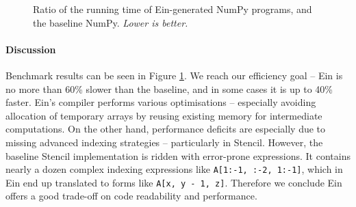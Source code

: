 \begin{figure}[b]
    \centering


    \caption{Ratio of the running time of Ein-generated NumPy programs, and the baseline NumPy. \textit{Lower is better.}}
    \label{fig:benchmark-results}
\end{figure}


\paragraph{Discussion} Benchmark results can be seen in Figure \ref{fig:benchmark-results}. 
We reach our efficiency goal -- Ein is no more than 60\% slower than the baseline, and in some cases it is up to 40\% faster.
Ein's compiler performs various optimisations -- especially avoiding allocation of temporary arrays by reusing existing memory for intermediate computations. 
On the other hand, performance deficits are especially due to missing advanced indexing strategies -- particularly in Stencil.
However, the baseline Stencil implementation is ridden with error-prone expressions. 
It contains nearly a dozen complex indexing expressions like \texttt{A[1:-1, :-2, 1:-1]}, which in Ein end up translated to forms like \texttt{A[x, y - 1, z]}.
Therefore we conclude Ein offers a good trade-off on code readability and performance.


